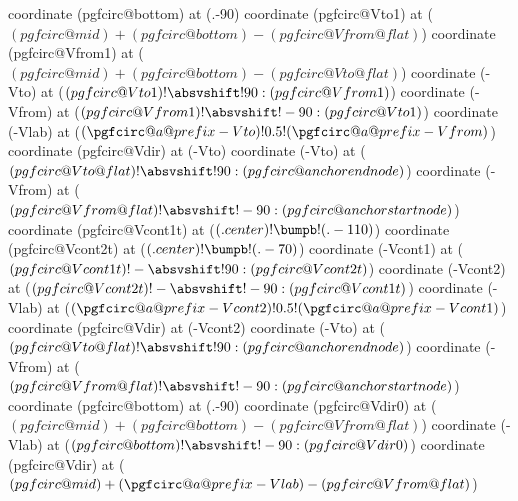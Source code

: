 {    \ifpgf@circuit@bipole@voltage@below
        \ifpgf@circuit@europeanvoltage
            \ifpgf@circuit@bipole@voltage@straight
                coordinate (pgfcirc@bottom) at (.-90)
                coordinate (pgfcirc@Vto1) at ($(pgfcirc@mid)+(pgfcirc@bottom)-(pgfcirc@Vfrom@flat)$)
                coordinate (pgfcirc@Vfrom1) at ($(pgfcirc@mid)+(pgfcirc@bottom)-(pgfcirc@Vto@flat)$)
                coordinate (\pgfcirc@a@prefix-Vto)   at ($(pgfcirc@Vto1) ! \absvshift!90 :  (pgfcirc@Vfrom1)$)
                coordinate (\pgfcirc@a@prefix-Vfrom) at ($(pgfcirc@Vfrom1) ! \absvshift!-90 :  (pgfcirc@Vto1)$)
                coordinate (\pgfcirc@a@prefix-Vlab) at ($(\pgfcirc@a@prefix-Vto)!0.5!(\pgfcirc@a@prefix-Vfrom) $)
                coordinate (pgfcirc@Vdir) at (\pgfcirc@a@prefix-Vto)
            \else
                coordinate (\pgfcirc@a@prefix-Vto)   at ($(pgfcirc@Vto@flat) ! \absvshift!90 :  (pgfcirc@anchorendnode)$)
                coordinate (\pgfcirc@a@prefix-Vfrom) at ($(pgfcirc@Vfrom@flat) ! \absvshift!-90 :  (pgfcirc@anchorstartnode)$)
                coordinate (pgfcirc@Vcont1t) at ($(\ctikzvalof{bipole/name}.center) ! \bumpb ! (\ctikzvalof{bipole/name}.-110)$)
                coordinate (pgfcirc@Vcont2t) at ($(\ctikzvalof{bipole/name}.center) ! \bumpb ! (\ctikzvalof{bipole/name}.-70)$)
                coordinate (\pgfcirc@a@prefix-Vcont1) at ($(pgfcirc@Vcont1t) ! -\absvshift!90 : (pgfcirc@Vcont2t)$)
                coordinate (\pgfcirc@a@prefix-Vcont2) at ($(pgfcirc@Vcont2t) ! -\absvshift!-90 : (pgfcirc@Vcont1t)$)
                coordinate (\pgfcirc@a@prefix-Vlab) at ($(\pgfcirc@a@prefix-Vcont2)!0.5!(\pgfcirc@a@prefix-Vcont1)$)
                coordinate (pgfcirc@Vdir) at (\pgfcirc@a@prefix-Vcont2)
            \fi
        \else
            coordinate (\pgfcirc@a@prefix-Vto) at ($(pgfcirc@Vto@flat) ! \absvshift!90 :  (pgfcirc@anchorendnode)$)
            coordinate (\pgfcirc@a@prefix-Vfrom) at ($(pgfcirc@Vfrom@flat) ! \absvshift!-90 :  (pgfcirc@anchorstartnode)$)
            coordinate (pgfcirc@bottom) at (.-90)
            coordinate (pgfcirc@Vdir0) at ($(pgfcirc@mid)+(pgfcirc@bottom)-(pgfcirc@Vfrom@flat)$)
            coordinate (\pgfcirc@a@prefix-Vlab) at ($(pgfcirc@bottom) !  \absvshift!-90 : (pgfcirc@Vdir0)$)
            coordinate (pgfcirc@Vdir) at ($(pgfcirc@mid)+(\pgfcirc@a@prefix-Vlab)-(pgfcirc@Vfrom@flat)$)
            \ifpgf@circuit@bipole@voltage@raised
}
